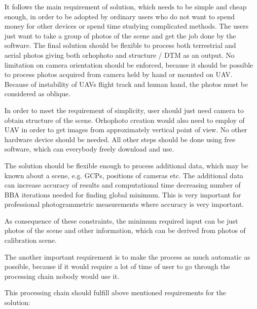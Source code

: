 \documentclass[a4paper,12pt]{article}
\begin{document}
It follows the main requirement 
of solution, which needs to be simple and cheap enough,
in order to be adopted by
ordinary users who do not want 
to spend money for other devices or spend time studying complicated methods. 
The users just 
want to take a group of photos of the scene and get the job done by the software.
The final solution should be flexible to process both terrestrial and aerial photos
giving both orhophoto and structure / DTM as an output. 
No limitation on camera orientation should be enforced, because it should be possible 
to process photos acquired from camera held by hand or mounted on UAV.
Because of instability of UAVs flight track and human hand, the photos 
must be considered as oblique. 


In order to meet the requirement of simplicity, user should just need  
 camera to obtain structure of the scene. Orhophoto creation would also need to employ of UAV
in order to get images from approximately vertical point of view.
No other hardware device should be needed. 
All other steps should be done 
using free software, which can everybody freely download and use. 



The solution should be flexible enough to process additional data, which may be known about a scene, 
e.g. GCPs, positions of cameras etc. The additional data can
 increase accuracy of results and computational time  
 decreasing number of  BBA iterations needed for finding global minimum. This is very important 
 for professional photogrammetric measurements where accuracy is very important.

As consequence of these constraints, the minimum required input can be just photos
of the scene and other information, which can be derived from photos of calibration scene.

The another important requirement is to make the process as much automatic as possible, because 
if it would require a lot of time of user to go through the processing chain nobody would use it.

This processing chain should fulfill above mentioned requirements for the solution:
\end{document}
